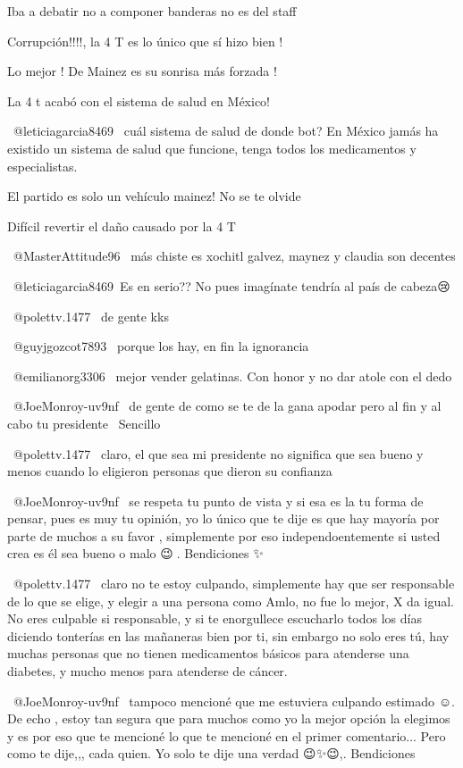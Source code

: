 Iba a debatir no a componer banderas no es del staff

Corrupción!!!!, la 4 T es lo único que sí hizo bien !

Lo mejor ! De Mainez es su sonrisa más forzada !

La 4 t acabó con el sistema de salud en México!

 @leticiagarcia8469  cuál sistema de salud de donde bot? En México jamás ha existido un sistema de salud que funcione, tenga todos los medicamentos y especialistas.

El partido es solo un vehículo mainez! No se te olvide

Difícil revertir el daño causado por la 4 T

​ @MasterAttitude96  más chiste es xochitl galvez, maynez y claudia son decentes

​ @leticiagarcia8469 Es en serio?? No pues imagínate tendría al país de cabeza😢

 @polettv.1477  de gente kks

 @guyjgozcot7893  porque los hay, en fin la ignorancia

 @emilianorg3306  mejor vender gelatinas. Con honor y no dar atole con el dedo

 @JoeMonroy-uv9nf  de gente de como se te de la gana apodar pero al fin y al cabo tu presidente🙈🇲🇽Sencillo💅🏻

 @polettv.1477  claro, el que sea mi presidente no significa que sea bueno y menos cuando lo eligieron personas que dieron su confianza

 @JoeMonroy-uv9nf  se respeta tu punto de vista y si esa es la tu forma de pensar, pues es muy tu opinión, yo lo único que te dije es que hay mayoría por parte de muchos a su favor , simplemente por eso independoentemente si usted crea es él sea bueno o malo 😉🧡. Bendiciones ✨👌🏻

 @polettv.1477  claro no te estoy culpando, simplemente hay que ser responsable de lo que se elige, y elegir a una persona como Amlo, no fue lo mejor, X da igual. No eres culpable si responsable, y si te enorgullece escucharlo todos los días diciendo tonterías en las mañaneras bien por ti, sin embargo no solo eres tú, hay muchas personas que no tienen medicamentos básicos para atenderse una diabetes, y mucho menos para atenderse de cáncer.

 @JoeMonroy-uv9nf  tampoco mencioné que me estuviera culpando estimado ☺️. De echo , estoy tan segura que para muchos como yo la mejor opción la elegimos y es por eso que te mencioné lo que te mencioné en el primer comentario... Pero como te dije,,, cada quien.  Yo solo te dije una verdad 😉✨😉,. Bendiciones 🧡

